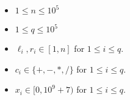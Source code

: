 \begin{itemize}
\tightlist
\item $1 \le n \le 10^5$
\item $1 \le q \le 10^5$
\item $\ell_i, r_i \in [1, n]$ for $1\le i \le q$.
\item $c_i \in\{+,-,*,/\}$ for $1\le i \le q$.
\item $x_i \in [0, 10^9+7)$ for $1\le i \le q$.
\end{itemize}
\newpage

